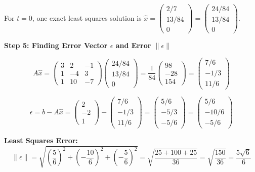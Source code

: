 \documentclass[12pt,a3paper]{article}
\begin{document}
\begin{tcolorbox}[enhanced,breakable,
  colback=cB!4,colframe=cB,boxrule=0.8pt,arc=5pt,
  title={\textbf{Answer --- Least Squares Analysis}},
  fonttitle=\bfseries\color{white},colbacktitle=cB]
For $t=0$, one exact least squares solution is $\hat{x} = \begin{pmatrix} 2/7 \\ 13/84 \\ 0 \end{pmatrix} = \begin{pmatrix} 24/84 \\ 13/84 \\ 0 \end{pmatrix}$.

\medskip
\textbf{Step 5: Finding Error Vector $\epsilon$ and Error $\|\epsilon\|$}

$$A\hat{x} = \begin{pmatrix} 3 & 2 & -1 \\ 1 & -4 & 3 \\ 1 & 10 & -7 \end{pmatrix} \begin{pmatrix} 24/84 \\ 13/84 \\ 0 \end{pmatrix} = \frac{1}{84}\begin{pmatrix} 98 \\ -28 \\ 154 \end{pmatrix} = \begin{pmatrix} 7/6 \\ -1/3 \\ 11/6 \end{pmatrix}$$

$$\epsilon = b - A\hat{x} = \begin{pmatrix} 2 \\ -2 \\ 1 \end{pmatrix} - \begin{pmatrix} 7/6 \\ -1/3 \\ 11/6 \end{pmatrix} = \begin{pmatrix} 5/6 \\ -5/3 \\ -5/6 \end{pmatrix} = \begin{pmatrix} 5/6 \\ -10/6 \\ -5/6 \end{pmatrix}$$

\textbf{Least Squares Error:} 
$$\|\epsilon\| = \sqrt{\left(\frac{5}{6}\right)^2 + \left(-\frac{10}{6}\right)^2 + \left(-\frac{5}{6}\right)^2} = \sqrt{\frac{25 + 100 + 25}{36}} = \sqrt{\frac{150}{36}} = \frac{5\sqrt{6}}{6}$$


\end{tcolorbox}
\end{document}
